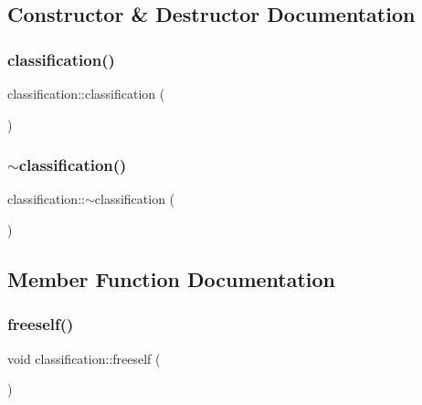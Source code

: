 \subsection{Constructor \& Destructor Documentation}
\mbox{\label{classclassification_a96cfefed3bbc9b8b61a44b9c6cc9e29a}} 
\subsubsection{\texorpdfstring{classification()}{classification()}}
{\footnotesize\ttfamily classification\+::classification (\begin{DoxyParamCaption}{ }\end{DoxyParamCaption})}

\mbox{\label{classclassification_ac65a474682b7c3b8661585de8b8f8f8b}} 
\subsubsection{\texorpdfstring{$\sim$classification()}{~classification()}}
{\footnotesize\ttfamily classification\+::$\sim$classification (\begin{DoxyParamCaption}{ }\end{DoxyParamCaption})}



\subsection{Member Function Documentation}
\mbox{\label{classclassification_ae3e04d2bc896aaf61cda2d5501407225}} 
\subsubsection{\texorpdfstring{freeself()}{freeself()}}
{\footnotesize\ttfamily void classification\+::freeself (\begin{DoxyParamCaption}{ }\end{DoxyParamCaption})}

